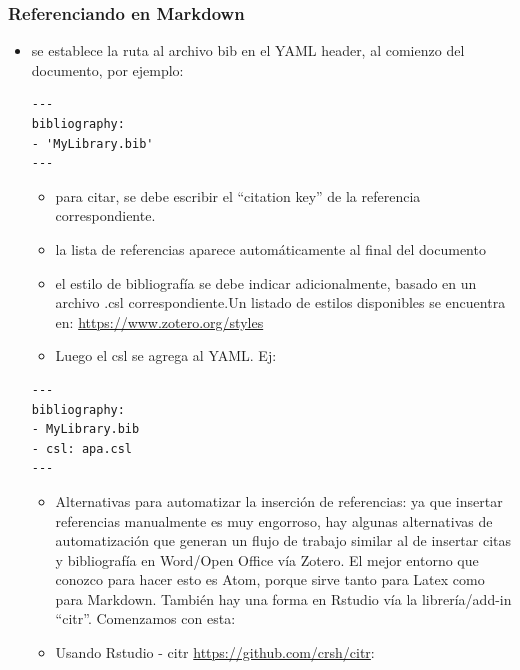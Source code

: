 \documentclass[11pt,]{book}
\providecommand{\tightlist}{%
  \setlength{\itemsep}{0pt}\setlength{\parskip}{0pt}}
\begin{document}
\hypertarget{referenciando-en-markdown}{%
\subsubsection{Referenciando en Markdown}\label{referenciando-en-markdown}}

\begin{itemize}
\item
  se establece la ruta al archivo bib en el YAML header, al comienzo del documento, por ejemplo:

\begin{verbatim}
---
bibliography:
- 'MyLibrary.bib'
---
\end{verbatim}

  \begin{itemize}
  \tightlist
  \item
    para citar, se debe escribir el ``citation key'' de la referencia correspondiente.
  \item
    la lista de referencias aparece automáticamente al final del documento
  \item
    el estilo de bibliografía se debe indicar adicionalmente, basado en un archivo .csl correspondiente.Un listado de estilos disponibles se encuentra en: \url{https://www.zotero.org/styles}
  \item
    Luego el csl se agrega al YAML. Ej:
  \end{itemize}

\begin{verbatim}
---
bibliography:
- MyLibrary.bib
- csl: apa.csl
---
\end{verbatim}

  \begin{itemize}
  \item
    Alternativas para automatizar la inserción de referencias: ya que insertar referencias manualmente es muy engorroso, hay algunas alternativas de automatización que generan un flujo de trabajo similar al de insertar citas y bibliografía en Word/Open Office vía Zotero. El mejor entorno que conozco para hacer esto es Atom, porque sirve tanto para Latex como para Markdown. También hay una forma en Rstudio vía la librería/add-in ``citr''. Comenzamos con esta:
  \item
    Usando Rstudio - citr \url{https://github.com/crsh/citr}:


\end{itemize}
\end{itemize}
\end{document}
